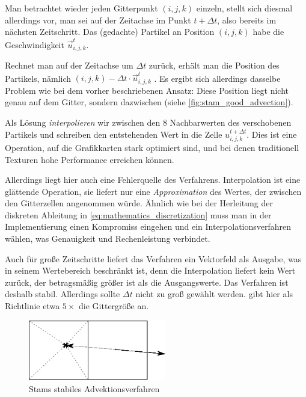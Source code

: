 Man betrachtet wieder jeden Gitterpunkt $(i,j,k)$ einzeln, stellt sich diesmal
allerdings vor, man sei auf der Zeitachse im Punkt $t+\Delta t$, also bereits im
nächsten Zeitschritt. Das (gedachte) Partikel an Position $(i,j,k)$ habe die
Geschwindigkeit $\vec{u}_{i,j,k}^t$.

Rechnet man auf der Zeitachse um $\Delta t$ zurück, erhält man die
 Position des Partikels, nämlich $(i,j,k) - \Delta t
\cdot \vec{u}_{i,j,k}^t$ . Es
ergibt sich allerdings dasselbe Problem wie bei dem vorher beschriebenen Ansatz:
Diese Position liegt nicht genau auf dem Gitter, sondern dazwischen (siehe
\autoref{fig:stam_good_advection}).

Als Lösung \emph{interpolieren} wir zwischen den 8 Nachbarwerten des
verschobenen Partikels und schreiben den entstehenden Wert in die Zelle
$u_{i,j,k}^{t+\Delta t}$. Dies ist eine Operation, auf die Grafikkarten stark
optimiert sind, und bei denen traditionell Texturen hohe Performance erreichen
können.

Allerdings liegt hier auch eine Fehlerquelle des Verfahrens. Interpolation ist
eine glättende Operation, sie liefert nur eine \emph{Approximation} des Wertes,
der zwischen den Gitterzellen angenommen würde. Ähnlich wie bei der
Herleitung der diskreten Ableitung in \autoref{eq:mathematics_discretization}
muss man in der Implementierung einen Kompromiss eingehen und ein
Interpolationsverfahren wählen, was Genauigkeit und Rechenleistung verbindet.

Auch für große Zeitschritte liefert das Verfahren ein Vektorfeld als Ausgabe,
was in seinem Wertebereich beschränkt ist, denn die Interpolation liefert kein
Wert zurück, der betragsmäßig größer ist als die Ausgangswerte. Das Verfahren
ist deshalb stabil. Allerdings sollte $\Delta t$ nicht zu groß gewählt werden.
\cite{Foster} gibt hier als Richtlinie etwa $5\times$ die Gittergröße an.

\begin{figure}[ht]
\centering
\includegraphics[width=6cm]{images/advection_good}
\caption{Stams stabiles Advektionsverfahren}
\label{fig:stam_good_advection}
\end{figure}

